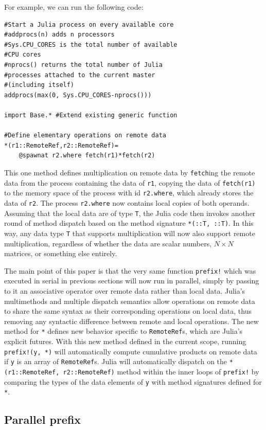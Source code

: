 \documentclass{sig-alternate}
\newcommand{\code}[1]{\texttt{#1}}
\begin{document}
For example, we can run the following code:

\begin{verbatim}
#Start a Julia process on every available core
#addprocs(n) adds n processors
#Sys.CPU_CORES is the total number of available
#CPU cores
#nprocs() returns the total number of Julia
#processes attached to the current master
#(including itself)
addprocs(max(0, Sys.CPU_CORES-nprocs()))

import Base.* #Extend existing generic function

#Define elementary operations on remote data
*(r1::RemoteRef,r2::RemoteRef)=
    @spawnat r2.where fetch(r1)*fetch(r2)
\end{verbatim}
%
This one method defines multiplication on remote data by \code{fetch}ing the
remote data from the process containing the data of \code{r1}, copying the data
of \code{fetch(r1)} to the memory space of the process with id \code{r2.where},
which already stores the data of \code{r2}. The process \code{r2.where} now
contains local copies of both operands. Assuming that the local data are of
type \code{T}, the Julia code then invokes another round of method dispatch
based on the method signature \code{*(::T, ::T)}. In this way, any data type
\code{T} that supports multiplication will now also support remote
multiplication, regardless of whether the data are scalar numbers, $N\times N$
matrices, or something else entirely.

The main point of this paper is that the very same function \code{prefix!}
which was executed in serial in previous sections will now run in parallel,
simply by passing to it an associative operator over remote data rather than
local data. Julia's multimethods and multiple dispatch semantics allow
operations on remote data to share the same syntax as their corresponding
operations on local data, thus removing any syntactic difference between remote
and local operations. The new method for \code{*} defines new behavior
specific to \code{RemoteRef}s, which are Julia's explicit futures. With this
new method defined in the current scope, running \code{prefix!(y, *)} will
automatically compute cumulative products on remote data if \code{y} is an
array of \code{RemoteRef}s. Julia will automatically dispatch on the
\code{*(r1::RemoteRef, r2::RemoteRef)} method within the inner loops of
\code{prefix!} by comparing the types of the data elements of \code{y} with
method signatures defined for \code{*}.

\subsection{Parallel prefix}
\label{sec:parallel-prefix}
\end{document}
